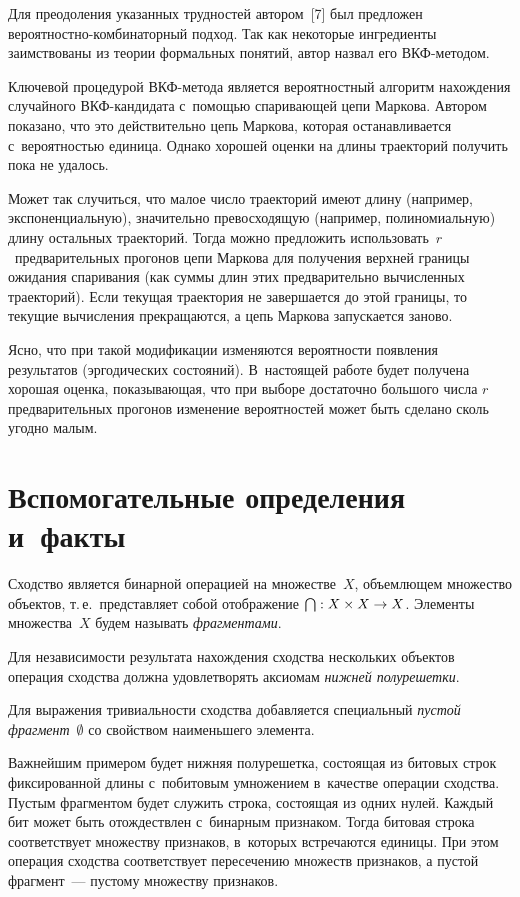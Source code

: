 \begin{multicols}{2}
    Для преодоления указанных трудностей автором~[7] был предложен  
ве\-ро\-ят\-ност\-но-ком\-би\-на\-тор\-ный подход. Так как некоторые 
ингредиенты заимствованы из теории формальных понятий, автор назвал его 
ВКФ-ме\-то\-дом.
    
    Ключевой процедурой ВКФ-ме\-то\-да является вероятностный 
алгоритм нахождения случайного ВКФ-кан\-ди\-да\-та с~помощью 
спаривающей цепи Маркова. Автором показано, что это действительно цепь 
Маркова, которая останавливается с~вероятностью единица. Однако хорошей 
оценки на длины траекторий получить пока не удалось. 
    
    Может так случиться, что малое число траекторий имеют длину 
(например, экспоненциальную), значительно превосходящую (например, 
полиномиальную) длину остальных траекторий. Тогда можно предложить 
использовать~$r$~предварительных прогонов цепи Маркова для получения 
верхней границы ожидания спаривания (как суммы длин этих 
предварительно вычисленных траекторий). Если текущая траектория не 
завершается до этой границы, то текущие вычисления прекращаются, а цепь 
Маркова запускается заново. 
    
    Ясно, что при такой модификации изменяются вероятности появления 
результатов (эргодических состояний). В~настоящей работе будет получена 
хорошая оценка, показывающая, что при выборе достаточно большого числа 
$r$ предварительных прогонов изменение вероятностей может быть сделано 
сколь угодно малым.

\section{Вспомогательные определения и~факты}

    Сходство является бинарной операцией на множестве~$X$, 
объемлющем множество объектов, т.\,е.\ представляет собой отображение 
$\bigcap: X\times X\hm\to X$. Элементы множества~$X$ будем называть 
\textit{фрагментами}. 
    
    Для независимости результата нахождения сходства нескольких 
объектов операция сходства должна удовлетворять аксиомам \textit{нижней 
полурешетки}.
    
    Для выражения тривиальности сходства до\-бав\-ля\-ет\-ся специальный 
\textit{пустой фрагмент}~$\emptyset$ со свойством наименьшего элемента.
    
    Важнейшим примером будет нижняя полурешетка, состоящая из 
битовых строк фиксированной длины с~побитовым умножением в~качестве 
операции сходства. Пустым фрагментом будет служить строка, состоящая из 
одних нулей. Каждый бит может быть отождествлен с~бинарным признаком. 
Тогда битовая строка соответствует множеству признаков, в~которых 
встречаются единицы. При этом операция сходства соответствует 
пересечению множеств признаков, а пустой фрагмент~--- пустому множеству 
признаков.
    

\end{multicols}
